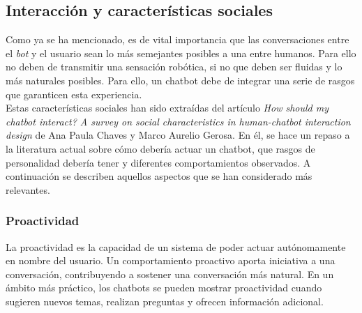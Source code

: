  
 




\subsection{Interacción y características sociales}
\label{interaccion}
Como ya se ha mencionado, es de vital importancia que las conversaciones entre el \textit{bot} y el usuario sean lo más semejantes posibles a una entre humanos. Para ello no deben de transmitir una sensación robótica, si no que deben ser fluidas y lo más naturales posibles. Para ello, un chatbot debe de integrar una serie de rasgos que garanticen esta experiencia.\\

Estas características sociales han sido extraídas del artículo \textit{How should my chatbot interact? A survey on social characteristics in human-chatbot interaction design} \cite{shouldInteract} de Ana Paula Chaves y Marco Aurelio Gerosa. En él, se hace un repaso a la literatura actual sobre cómo debería actuar un chatbot, que rasgos de personalidad debería tener y diferentes comportamientos observados. A continuación se describen aquellos aspectos que se han considerado más relevantes.\\

\subsubsection{Proactividad}
La proactividad es la capacidad de un sistema de poder actuar autónomamente en nombre del usuario. Un comportamiento proactivo aporta iniciativa a una conversación, contribuyendo a sostener una conversación más natural. En un ámbito más práctico, los chatbots se pueden mostrar proactividad cuando sugieren nuevos temas, realizan preguntas y ofrecen información adicional.\\

